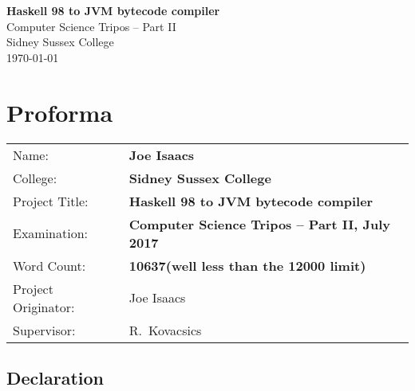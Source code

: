 \documentclass[12pt,a4paper,twoside,openright]{book}
\numberwithin{subcase}{case}
\begin{document}

\thispagestyle{empty}

\pagestyle{empty}
\begingroup


\vspace*{60mm}
\begin{center}
\Huge
\textbf{Haskell 98 to JVM bytecode compiler} \\[5mm]
Computer Science Tripos -- Part II \\[5mm]
Sidney Sussex College \\[5mm]
\today  %
\end{center}


\newpage

\thispagestyle{empty}


\pagestyle{plain}

\frontmatter

\chapter*{Proforma}

{\large
\begin{tabular}{ll}
Name:               & \bf Joe Isaacs                            \\
College:            & \bf Sidney Sussex College                 \\
Project Title:      & \bf Haskell 98 to JVM bytecode compiler   \\
Examination:        & \bf Computer Science Tripos -- Part II, July 2017  \\
Word Count:         & \bf 10637\footnotemark[1]
                    (well less than the 12000 limit)  \\
Project Originator: & Joe Isaacs                      \\
Supervisor:         & R.~Kovacsics                    \\ 
\end{tabular}
}


\section*{Declaration}
\end{document}
